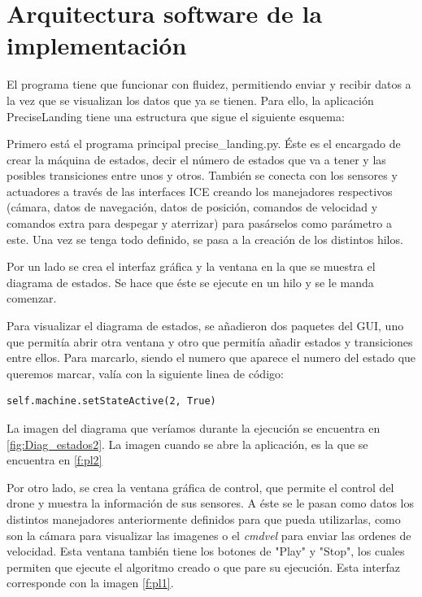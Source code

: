 \section{Arquitectura software de la implementaci\'on}

\hspace{1 cm} El programa tiene que funcionar con fluidez, permitiendo enviar y recibir datos a la vez que se visualizan los datos que ya se tienen. Para ello, la aplicaci\'on PreciseLanding tiene una estructura que sigue el siguiente esquema:

\hspace{1 cm} Primero est\'a el programa principal precise\_landing.py. \'Este es el encargado de crear la m\'aquina de estados, decir el n\'umero de estados que va a tener y las posibles transiciones entre unos y otros. Tambi\'en se conecta con los sensores y actuadores a trav\'es de las interfaces ICE creando los manejadores respectivos (c\'amara, datos de navegaci\'on, datos de posici\'on, comandos de velocidad y comandos extra para despegar y aterrizar) para pas\'arselos como par\'ametro a este. Una vez se tenga todo definido, se pasa a la creaci\'on de los distintos hilos.

\hspace{1 cm} Por un lado se crea el interfaz gr\'afica y la ventana en la que se muestra el diagrama de estados. Se hace que \'este se ejecute en un hilo y se le manda comenzar.

\hspace{1cm} Para visualizar el diagrama de estados, se añadieron dos paquetes del GUI, uno que permit\'ia abrir otra ventana y otro que permit\'ia añadir estados y transiciones entre ellos. Para marcarlo, siendo el numero que aparece el numero del estado que queremos marcar, val\'ia con la siguiente linea de c\'odigo:

\begin{lstlisting}[backgroundcolor=\color{yellow}]
self.machine.setStateActive(2, True)
\end{lstlisting}
	
\hspace{1cm}La imagen del diagrama que ver\'iamos durante la ejecuci\'on se encuentra en \ref{fig:Diag_estados2}. La imagen cuando se abre la aplicaci\'on, es la que se encuentra en \ref{f:pl2}

\hspace{1 cm} Por otro lado, se crea la ventana gr\'afica de control, que permite el control del drone y muestra la informaci\'on de sus sensores. A \'este se le pasan como datos los distintos manejadores anteriormente definidos para que pueda utilizarlas, como son la c\'amara para visualizar las imagenes o el \textit{cmdvel} para enviar las ordenes de velocidad. Esta ventana tambi\'en tiene los botones de "Play" y "Stop", los cuales permiten que ejecute el algoritmo creado o que pare su ejecuci\'on. Esta interfaz corresponde con la imagen \ref{f:pl1}.

